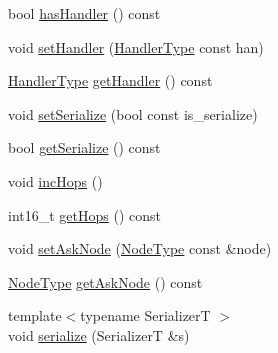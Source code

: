 \begin{DoxyCompactItemize}
\item 
bool \hyperlink{structvt_1_1location_1_1_entity_msg_a0796bd63248dae2b457aa2eedc345743}{has\+Handler} () const
\item 
void \hyperlink{structvt_1_1location_1_1_entity_msg_af3c49e5e6d894d29984bf9ebf3983717}{set\+Handler} (\hyperlink{namespacevt_af64846b57dfcaf104da3ef6967917573}{Handler\+Type} const han)
\item 
\hyperlink{namespacevt_af64846b57dfcaf104da3ef6967917573}{Handler\+Type} \hyperlink{structvt_1_1location_1_1_entity_msg_ab373f1520ac7374900bbea1026372b8e}{get\+Handler} () const
\item 
void \hyperlink{structvt_1_1location_1_1_entity_msg_a3a26a497f5d3107ca513582c842963bd}{set\+Serialize} (bool const is\+\_\+serialize)
\item 
bool \hyperlink{structvt_1_1location_1_1_entity_msg_a0dc24a126251cb00a1e44b19eeb9208e}{get\+Serialize} () const
\item 
void \hyperlink{structvt_1_1location_1_1_entity_msg_a2bd45f682dbeb4f6a39ded357483012b}{inc\+Hops} ()
\item 
int16\+\_\+t \hyperlink{structvt_1_1location_1_1_entity_msg_a42198cb01c34983b7c46103cea721b9f}{get\+Hops} () const
\item 
void \hyperlink{structvt_1_1location_1_1_entity_msg_a42166a96c86f14d91cf378ff2e315db6}{set\+Ask\+Node} (\hyperlink{namespacevt_a866da9d0efc19c0a1ce79e9e492f47e2}{Node\+Type} const \&node)
\item 
\hyperlink{namespacevt_a866da9d0efc19c0a1ce79e9e492f47e2}{Node\+Type} \hyperlink{structvt_1_1location_1_1_entity_msg_a5a95c196dd8c41a15988b90bca30a316}{get\+Ask\+Node} () const
\item 
{\footnotesize template$<$typename SerializerT $>$ }\\void \hyperlink{structvt_1_1location_1_1_entity_msg_a203b07e756313743e7258b8b1dbcb527}{serialize} (SerializerT \&s)
\end{DoxyCompactItemize}
